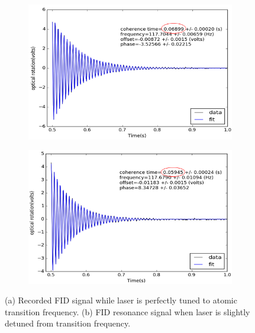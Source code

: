 \begin{itemize}
\begin{figure}
    \begin{subfigure}[b]{0.45\textwidth}
        \centering
        \includegraphics[width=\textwidth]{figures/perfect_tuning}
        \caption{}
        \label{fig:good tuning}
    \end{subfigure}
    \hfill
    \begin{subfigure}[b]{0.45\textwidth}
        \centering
        \includegraphics[width=\textwidth]{figures/bad_tuning}
        \caption{}
        \label{fig:bad tuning}
    \end{subfigure}
    \caption{(a) Recorded FID signal while laser is perfectly tuned to atomic transition frequency. (b) FID resonance signal when laser is slightly detuned from transition frequency.}
    \label{fig:effect of tuning}
\end{figure}
	

\end{itemize}
